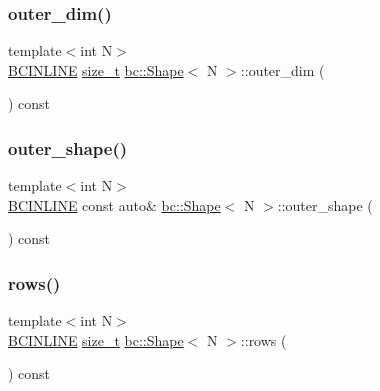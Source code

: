 \mbox{\label{structbc_1_1Shape_a949fecc85ed922edd5ffb185825ef22e}} 
\subsubsection{\texorpdfstring{outer\+\_\+dim()}{outer\_dim()}}
{\footnotesize\ttfamily template$<$int N$>$ \\
\hyperlink{common_8h_a6699e8b0449da5c0fafb878e59c1d4b1}{B\+C\+I\+N\+L\+I\+NE} \hyperlink{structbc_1_1Shape_a63f974ebdb0e3755ef3140b17abcf235}{size\+\_\+t} \hyperlink{structbc_1_1Shape}{bc\+::\+Shape}$<$ N $>$\+::outer\+\_\+dim (\begin{DoxyParamCaption}{ }\end{DoxyParamCaption}) const\hspace{0.3cm}{\ttfamily [inline]}}

\mbox{\label{structbc_1_1Shape_a693859c37be584f1001ce309067fc165}} 
\subsubsection{\texorpdfstring{outer\+\_\+shape()}{outer\_shape()}}
{\footnotesize\ttfamily template$<$int N$>$ \\
\hyperlink{common_8h_a6699e8b0449da5c0fafb878e59c1d4b1}{B\+C\+I\+N\+L\+I\+NE} const auto\& \hyperlink{structbc_1_1Shape}{bc\+::\+Shape}$<$ N $>$\+::outer\+\_\+shape (\begin{DoxyParamCaption}{ }\end{DoxyParamCaption}) const\hspace{0.3cm}{\ttfamily [inline]}}

\mbox{\label{structbc_1_1Shape_a528691cf43e9d1bdbb4c8405292092f2}} 
\subsubsection{\texorpdfstring{rows()}{rows()}}
{\footnotesize\ttfamily template$<$int N$>$ \\
\hyperlink{common_8h_a6699e8b0449da5c0fafb878e59c1d4b1}{B\+C\+I\+N\+L\+I\+NE} \hyperlink{structbc_1_1Shape_a63f974ebdb0e3755ef3140b17abcf235}{size\+\_\+t} \hyperlink{structbc_1_1Shape}{bc\+::\+Shape}$<$ N $>$\+::rows (\begin{DoxyParamCaption}{ }\end{DoxyParamCaption}) const\hspace{0.3cm}{\ttfamily [inline]}}

